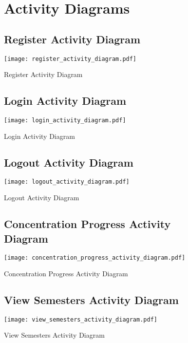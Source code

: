 \documentclass[12pt]{article}
\begin{document}
\begin{figure}[p!]
  \section{Activity Diagrams}
  \subsection{Register Activity Diagram}
  \centering
  \texttt{[image: register\_activity\_diagram.pdf]}
  \caption{Register Activity Diagram}
\end{figure}

\begin{figure}[p!]
  \subsection{Login Activity Diagram}
  \centering
  \texttt{[image: login\_activity\_diagram.pdf]}
  \caption{Login Activity Diagram}
\end{figure}

\begin{figure}[p!]
  \subsection{Logout Activity Diagram}
  \centering
  \texttt{[image: logout\_activity\_diagram.pdf]}
  \caption{Logout Activity Diagram}
\end{figure}

\begin{figure}[p!]
  \subsection{Concentration Progress Activity Diagram}
  \centering
  \texttt{[image: concentration\_progress\_activity\_diagram.pdf]}
  \caption{Concentration Progress Activity Diagram}
\end{figure}

\begin{figure}[p!]
  \subsection{View Semesters Activity Diagram}
  \centering
  \texttt{[image: view\_semesters\_activity\_diagram.pdf]}
  \caption{View Semesters Activity Diagram}
\end{figure}
\end{document}
